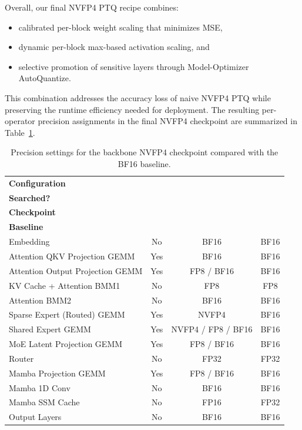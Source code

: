 Overall, our final NVFP4 PTQ recipe combines:
\begin{itemize}
    \item calibrated per-block weight scaling that minimizes MSE,
    \item dynamic per-block max-based activation scaling, and
    \item selective promotion of sensitive layers through Model-Optimizer AutoQuantize.
\end{itemize}
This combination addresses the accuracy loss of naive NVFP4 PTQ while preserving the runtime efficiency needed for deployment. The resulting per-operator precision assignments in the final NVFP4 checkpoint are summarized in Table~\ref{tab:precision_nvfp4}.

\begin{table}[h]
\centering
\caption{Precision settings for the backbone NVFP4 checkpoint compared with the BF16 baseline.}
\label{tab:precision_nvfp4}
\begin{tabular}{l c c c}
\toprule
\textbf{Configuration} &
\makecell{\textbf{AutoQuantize}\\\textbf{Searched?}} &
\makecell{\textbf{NVFP4}\\\textbf{Checkpoint}} &
\makecell{\textbf{BF16}\\\textbf{Baseline}} \\
\midrule
Embedding & No & BF16 & BF16 \\
\midrule
Attention QKV Projection GEMM & Yes & BF16 & BF16 \\
Attention Output Projection GEMM & Yes & FP8 / BF16 & BF16 \\
KV Cache + Attention BMM1 & No & FP8 & FP8 \\
Attention BMM2 & No & BF16 & BF16 \\
\midrule
Sparse Expert (Routed) GEMM & Yes & NVFP4 & BF16 \\
Shared Expert GEMM & Yes & NVFP4 / FP8 / BF16 & BF16 \\
MoE Latent Projection GEMM & Yes & FP8 / BF16 & BF16 \\
Router & No & FP32 & FP32 \\
\midrule
Mamba Projection GEMM & Yes & FP8 / BF16 & BF16 \\
Mamba 1D Conv & No & BF16 & BF16 \\
Mamba SSM Cache & No & FP16 & FP32 \\
\midrule
Output Layers & No & BF16 & BF16 \\
\bottomrule
\end{tabular}


\end{table}
